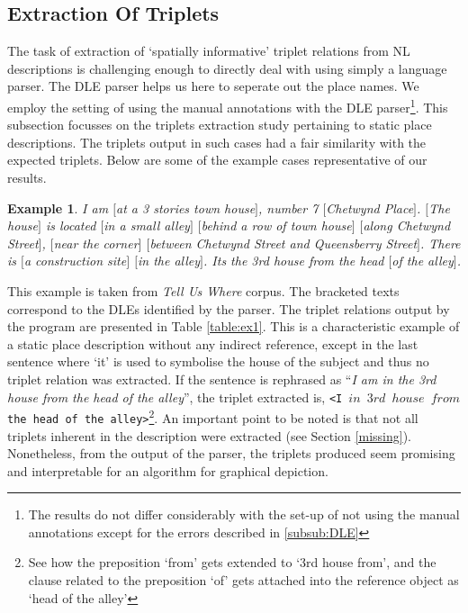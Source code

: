 \documentclass{acm_proc_article-sp}
\begin{document}
\subsection{Extraction Of Triplets}
The task of extraction of `spatially informative' triplet relations from NL descriptions is challenging enough to directly deal with using simply a language parser. The DLE parser helps us here to seperate out the place names. We employ the setting of using the manual annotations with the DLE parser\footnote{The results do not differ considerably with the set-up of not using the manual annotations except for the errors described in \ref{subsub:DLE}}. This subsection focusses on the triplets extraction study pertaining to static place descriptions. The triplets output in such cases had a fair similarity with the expected triplets. Below are some of the example cases representative of our results. 
\newtheorem{example}{Example}
\begin{example}
I am $[$at a 3 stories town house$]$, number 7 $[$Chetwynd Place$]$. $[$The house$]$ is located $[$in a small alley$]$ $[$behind a row of town house$]$ $[$along Chetwynd Street$]$, $[$near the corner$]$ $[$between Chetwynd Street and Queensberry Street$]$. There is $[$a construction site$]$ $[$in the alley$]$. Its the 3rd house from the head $[$of the alley$]$.
\end{example}
This example is taken from \textit{Tell Us Where} corpus. The bracketed texts correspond to the DLEs identified by the parser. The triplet relations output by the program are presented in Table \ref{table:ex1}. This is a characteristic example of a static place description without any indirect reference, except in the last sentence where `it' is used to symbolise the house of the subject and thus no triplet relation was extracted. If the sentence is rephrased as ``\textit{I am in the 3rd house from the head of the alley}'', the triplet extracted is, \texttt{<I $in$ $3rd$ $house$ $from$ the head of the alley>}\footnote{See how the preposition `from' gets extended to `3rd house from', and the clause related to the preposition `of' gets attached into the reference object as `head of the alley'}. An important point to be noted is that not all triplets inherent in the description were extracted (see Section \ref{missing}). Nonetheless, from the output of the parser, the triplets produced seem promising and interpretable for an algorithm for graphical depiction. 
\end{document}
